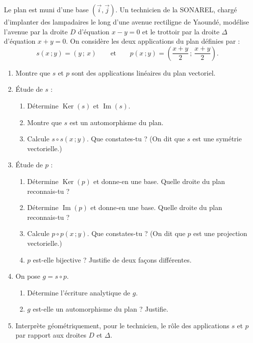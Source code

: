 \documentclass[11pt]{article}
\begin{document}
\begin{exercice}
Le plan est muni d'une base $(\vec{i},\vec{j})$. Un technicien de la SONAREL, chargé d'implanter des lampadaires le long d'une avenue rectiligne de Yaoundé, modélise l'avenue par la droite $D$ d'équation $x-y=0$ et le trottoir par la droite $\Delta$ d'équation $x+y=0$. On considère les deux applications du plan définies par :
\[ s(x\,;y)=(y\,;\,x) \qquad \text{et} \qquad p(x\,;y)=\left(\dfrac{x+y}{2}\,;\,\dfrac{x+y}{2}\right). \]
\begin{enumerate}
\item Montre que $s$ et $p$ sont des applications linéaires du plan vectoriel.
\item Étude de $s$ :
\begin{enumerate}
\item Détermine $\operatorname{Ker}(s)$ et $\operatorname{Im}(s)$.
\item Montre que $s$ est un automorphisme du plan.
\item Calcule $s\circ s(x\,;y)$. Que constates-tu ? (On dit que $s$ est une symétrie vectorielle.)
\end{enumerate}
\item Étude de $p$ :
\begin{enumerate}
\item Détermine $\operatorname{Ker}(p)$ et donne-en une base. Quelle droite du plan reconnais-tu ?
\item Détermine $\operatorname{Im}(p)$ et donne-en une base. Quelle droite du plan reconnais-tu ?
\item Calcule $p\circ p(x\,;y)$. Que constates-tu ? (On dit que $p$ est une projection vectorielle.)
\item $p$ est-elle bijective ? Justifie de deux façons différentes.
\end{enumerate}
\item On pose $g=s\circ p$.
\begin{enumerate}
\item Détermine l'écriture analytique de $g$.
\item $g$ est-elle un automorphisme du plan ? Justifie.
\end{enumerate}
\item Interprète géométriquement, pour le technicien, le rôle des applications $s$ et $p$ par rapport aux droites $D$ et $\Delta$.
\end{enumerate}
\end{exercice}
\end{document}
